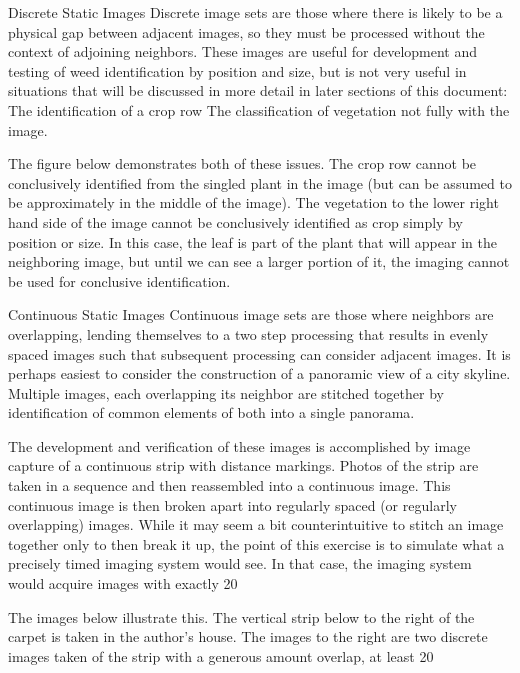 \documentclass[letterpaper]{article}
\begin{document}
Discrete Static Images
Discrete image sets are those where there is likely to be a physical gap between adjacent images, so they must be processed without the context of adjoining neighbors. These images are useful for development and testing of weed identification by position and size, but is not very useful in situations that will be discussed in more detail in later sections of this document:
The identification of a crop row
The classification of vegetation not fully with the image.

The figure below demonstrates both of these issues. The crop row cannot be conclusively identified from the singled plant in the image (but can be assumed to be approximately in the middle of the image). The vegetation to the lower right hand side of the image cannot be conclusively identified as crop simply by position or size. In this case, the leaf is part of the plant that will appear in the neighboring image, but until we can see a larger portion of it, the imaging cannot be used for conclusive identification.


Continuous Static Images
Continuous image sets are those where neighbors are overlapping, lending themselves to a two step processing that results in evenly spaced images such that subsequent processing can consider adjacent images. It is perhaps easiest to consider the construction of a panoramic view of a city skyline. Multiple images, each overlapping its neighbor are stitched together by identification of common elements of both into a single panorama.

The development and verification of these images is accomplished by image capture of a continuous strip with distance markings. Photos of the strip are taken in a sequence and then reassembled into a continuous image. This continuous image is then broken apart into regularly spaced (or regularly overlapping) images. While it may seem a bit counterintuitive to stitch an image together only to then break it up, the point of this exercise is to simulate what a precisely timed imaging system would see. In that case, the imaging system would acquire images with exactly 20%

The images below illustrate this. The vertical strip below to the right of the carpet is taken in the author’s house.  The images to the right are two discrete images taken of the strip with  a generous amount overlap, at least 20%
\end{document}
